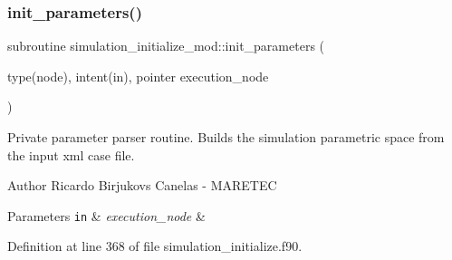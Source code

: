 \mbox{\label{namespacesimulation__initialize__mod_a4ee29d81788bb77840a67af18784da66}} 
\subsubsection{\texorpdfstring{init\+\_\+parameters()}{init\_parameters()}}
{\footnotesize\ttfamily subroutine simulation\+\_\+initialize\+\_\+mod\+::init\+\_\+parameters (\begin{DoxyParamCaption}\item[{type(node), intent(in), pointer}]{execution\+\_\+node }\end{DoxyParamCaption})\hspace{0.3cm}{\ttfamily [private]}}



Private parameter parser routine. Builds the simulation parametric space from the input xml case file. 

\begin{DoxyAuthor}{Author}
Ricardo Birjukovs Canelas -\/ M\+A\+R\+E\+T\+EC 
\end{DoxyAuthor}

\begin{DoxyParams}[1]{Parameters}
\mbox{\tt in}  & {\em execution\+\_\+node} & \\
\hline
\end{DoxyParams}


Definition at line 368 of file simulation\+\_\+initialize.\+f90.


